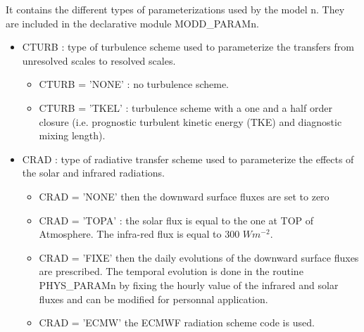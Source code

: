 It contains the different types of parameterizations used by the model n. They are
included in the declarative module MODD\_PARAMn. 
\begin{itemize}
\item
{}
CTURB :  type of turbulence scheme used to parameterize the transfers from
unresolved scales to resolved scales.
\begin{itemize}
\item
CTURB = 'NONE' : no turbulence scheme.
\item
CTURB = 'TKEL' : turbulence scheme with a one and a half  order closure
 (i.e.
 prognostic turbulent kinetic energy (TKE) and diagnostic mixing length).
\end{itemize}
 
\item
{}
CRAD  :  type of radiative transfer scheme used to parameterize the
effects of the solar and infrared radiations.
\begin{itemize}
\item
CRAD = 'NONE' then the downward surface fluxes are set to zero
\item
CRAD = 'TOPA' : the solar flux is equal to the one at TOP of Atmosphere. The infra-red flux is equal to 300 $Wm^{-2}$.
\item
CRAD = 'FIXE' then the daily evolutions of the downward surface
fluxes are prescribed. The temporal evolution is done in the routine
PHYS\_PARAMn by fixing the hourly value of the infrared and solar
fluxes and can be modified for personnal application.
\item
CRAD = 'ECMW' the ECMWF radiation scheme code is used.
\end{itemize} 


\end{itemize}
